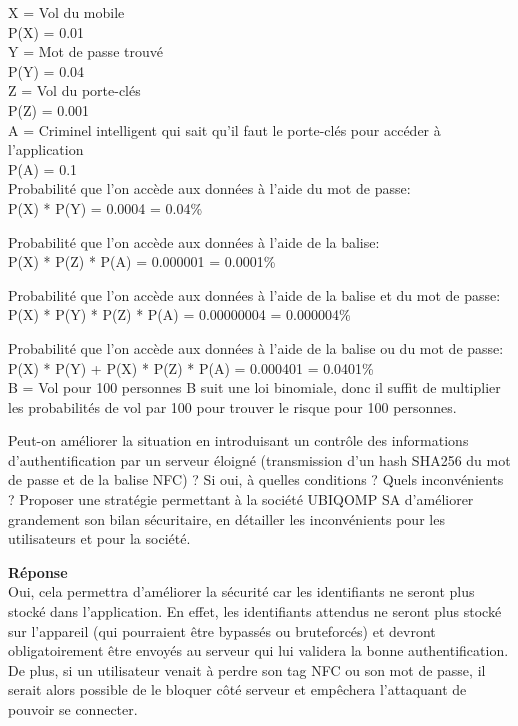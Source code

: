 \documentclass[a4paper]{article}
\begin{document}
\begin{enumerate}
    X = Vol du mobile \\
    P(X) = 0.01 \\
    
    Y = Mot de passe trouvé \\
    P(Y) = 0.04 \\
    
    Z = Vol du porte-clés \\
    P(Z) = 0.001 \\
    
    A = Criminel intelligent qui sait qu'il faut le porte-clés pour accéder à l'application \\
    P(A) = 0.1 \\
    
    
    Probabilité que l'on accède aux données à l'aide du mot de passe: \\
    P(X) * P(Y) = 0.0004 = 0.04\%
    
    Probabilité que l'on accède aux données à l'aide de la balise: \\
    P(X) * P(Z) * P(A) = 0.000001 = 0.0001\%
    
    Probabilité que l'on accède aux données à l'aide de la balise et du mot de passe: \\
    P(X) * P(Y) * P(Z) * P(A) = 0.00000004 = 0.000004\%
    
    
    Probabilité que l'on accède aux données à l'aide de la balise ou du mot de passe: \\
    P(X) * P(Y) + P(X) * P(Z) * P(A) = 0.000401 = 0.0401\% \\
    
    B = Vol pour 100 personnes
    B suit une loi binomiale, donc il suffit de multiplier les probabilités de vol par 100 pour trouver le risque pour 100 personnes.
    
    \pagebreak
    
    Peut-on améliorer la situation en introduisant un contrôle des informations d'authentification par un serveur éloigné (transmission d'un hash SHA256 du mot de passe et de la balise NFC) ? Si oui, à quelles conditions ? Quels inconvénients ?
    Proposer une stratégie permettant à la société UBIQOMP SA d'améliorer grandement son bilan
    sécuritaire, en détailler les inconvénients pour les utilisateurs et pour la société.
    
    \textbf{Réponse} \\
    Oui, cela permettra d'améliorer la sécurité car les identifiants ne seront plus stocké dans l'application. En effet, les identifiants attendus ne seront plus stocké sur l'appareil (qui pourraient être bypassés ou bruteforcés) et devront obligatoirement être envoyés au serveur qui lui validera la bonne authentification. De plus, si un utilisateur venait à perdre son tag NFC ou son mot de passe, il serait alors possible de le bloquer côté serveur et empêchera l'attaquant de pouvoir se connecter.
    

\end{enumerate}
\end{document}
